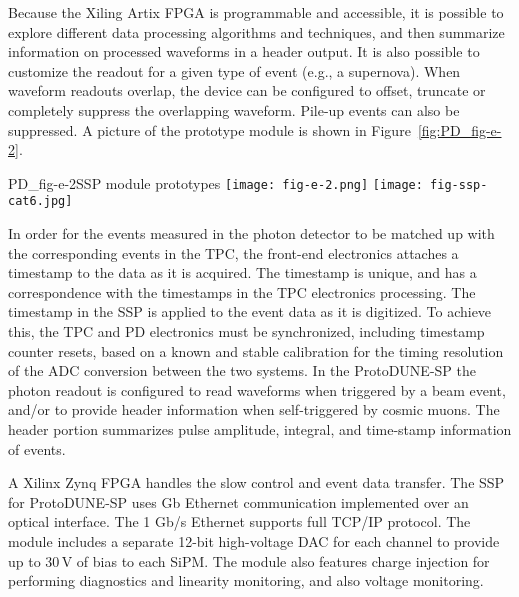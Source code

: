 Because  the Xiling Artix FPGA  is programmable  and accessible, it is possible to  explore  
different data processing algorithms  and  techniques,  and then  summarize
information  on  processed  waveforms  in %
a header  output. 
It is also possible to customize the readout for a given type of event (e.g., a supernova).  
When waveform readouts overlap, the device can be configured to offset, 
truncate or completely suppress the overlapping waveform.  
Pile-up events can also be suppressed.  A picture of the prototype module is shown in Figure~\ref{fig:PD_fig-e-2}.  
%
\begin{cdrfigure}{PD_fig-e-2}{SSP module prototypes} 
\texttt{[image: fig-e-2.png]} \texttt{[image: fig-ssp-cat6.jpg]}
\end{cdrfigure}
%

In order for the events measured in the photon detector to be matched up 
with the corresponding events in the TPC, the front-end electronics 
attaches a timestamp to the data as it is acquired.  
The timestamp is unique, and has a correspondence with the timestamps in 
the TPC electronics processing.  
The timestamp in the SSP is applied to the event data as it is digitized. 
To achieve this, the TPC and PD electronics must be synchronized, 
including timestamp counter resets, based on a known and stable calibration 
for the timing resolution of the ADC conversion between the two systems.  
In the ProtoDUNE-SP the photon readout is configured to read waveforms when triggered by a beam event,
and/or to provide header information when self-triggered by cosmic muons.
The header portion summarizes pulse amplitude, integral, and time-stamp information of events.

A Xilinx Zynq FPGA handles the slow control and event data transfer.  
The SSP for ProtoDUNE-SP uses Gb Ethernet communication implemented over an optical interface.
The 1 Gb/s Ethernet supports full TCP/IP protocol.  
The module includes a separate 12-bit high-voltage DAC for each channel to 
provide up to 30\,V of bias to each SiPM.  
The module also features charge injection for performing diagnostics and linearity 
monitoring, and also voltage monitoring.

